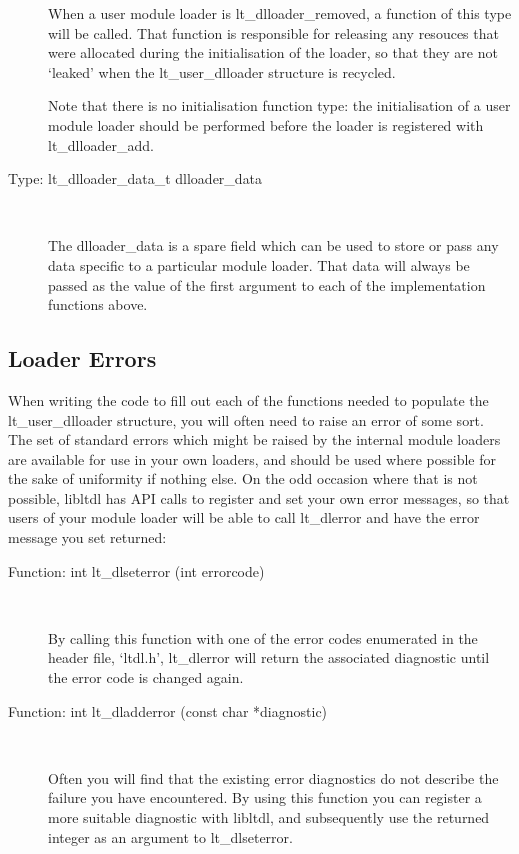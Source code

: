 \begin{description}
    When a user module loader is lt\_{}dlloader\_{}removed, a function of this type will be called. That function is responsible for releasing any resouces that were allocated during the initialisation of the loader, so that they are not `leaked' when the lt\_{}user\_{}dlloader structure is recycled.

    Note that there is no initialisation function type: the initialisation of a user module loader should be performed before the loader is registered with lt\_{}dlloader\_{}add. 

\item[Type: lt\_{}dlloader\_{}data\_{}t dlloader\_{}data]
\

    The dlloader\_{}data is a spare field which can be used to store or pass any data specific to a particular module loader. That data will always be passed as the value of the first argument to each of the implementation functions above. 
\end{description}

\subsection{Loader Errors}

When writing the code to fill out each of the functions needed to populate the lt\_{}user\_{}dlloader structure, you will often need to raise an error of some sort. The set of standard errors which might be raised by the internal module loaders are available for use in your own loaders, and should be used where possible for the sake of uniformity if nothing else. On the odd occasion where that is not possible, libltdl has API calls to register and set your own error messages, so that users of your module loader will be able to call lt\_{}dlerror and have the error message you set returned:

\begin{description}
\item[Function: int lt\_{}dlseterror (int errorcode)]
\

    By calling this function with one of the error codes enumerated in the header file, `ltdl.h', lt\_{}dlerror will return the associated diagnostic until the error code is changed again. 

\item[Function: int lt\_{}dladderror (const char *diagnostic)]
\

    Often you will find that the existing error diagnostics do not describe the failure you have encountered. By using this function you can register a more suitable diagnostic with libltdl, and subsequently use the returned integer as an argument to lt\_{}dlseterror. 
\end{description}

